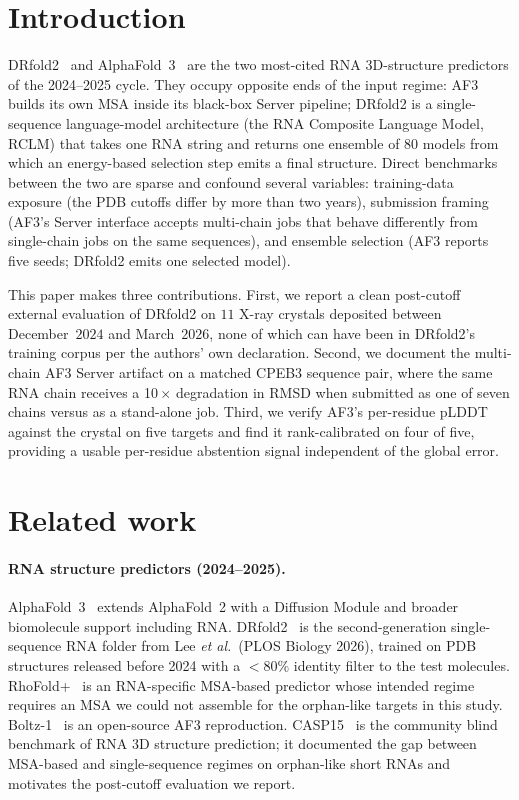 \documentclass[11pt,a4paper]{article}
\begin{document}
\section{Introduction}

DRfold2~\cite{drfold2_2025} and AlphaFold~3~\cite{af3_2024} are the
two most-cited RNA 3D-structure predictors of the 2024--2025 cycle.
They occupy opposite ends of the input regime: AF3 builds its own MSA
inside its black-box Server pipeline; DRfold2 is a single-sequence
language-model architecture (the RNA Composite Language Model, RCLM)
that takes one RNA string and returns one ensemble of $80$ models from
which an energy-based selection step emits a final structure. Direct
benchmarks between the two are sparse and confound several variables:
training-data exposure (the PDB cutoffs differ by more than two
years), submission framing (AF3's Server interface accepts
multi-chain jobs that behave differently from single-chain jobs on
the same sequences), and ensemble selection (AF3 reports five
seeds; DRfold2 emits one selected model).

This paper makes three contributions. First, we report a clean
post-cutoff external evaluation of DRfold2 on $11$ X-ray crystals
deposited between December~$2024$ and March~$2026$, none of which can
have been in DRfold2's training corpus per the authors' own
declaration. Second, we document the multi-chain AF3 Server artifact
on a matched CPEB3 sequence pair, where the same RNA chain receives
a 10\,$\times$ degradation in RMSD when submitted as one of seven
chains versus as a stand-alone job. Third, we verify AF3's
per-residue pLDDT against the crystal on five targets and find it
rank-calibrated on four of five, providing a usable per-residue
abstention signal independent of the global error.

\section{Related work}

\paragraph{RNA structure predictors (2024--2025).}
AlphaFold~3~\cite{af3_2024} extends AlphaFold~2 with a Diffusion
Module and broader biomolecule support including
RNA. DRfold2~\cite{drfold2_2025} is the second-generation
single-sequence RNA folder from Lee \textit{et al.}\
(PLOS Biology 2026), trained on PDB structures released before
2024 with a $<\!80\%$ identity filter to the test molecules.
RhoFold+~\cite{rhofold2024} is an
RNA-specific MSA-based predictor whose intended regime requires an
MSA we could not assemble for the orphan-like targets in this
study. Boltz-1~\cite{boltz_2024} is an open-source AF3 reproduction.
CASP15~\cite{casp15_rna} is the community blind benchmark of RNA 3D
structure prediction; it documented the gap between MSA-based and
single-sequence regimes on orphan-like short RNAs and motivates
the post-cutoff evaluation we report.
\end{document}
